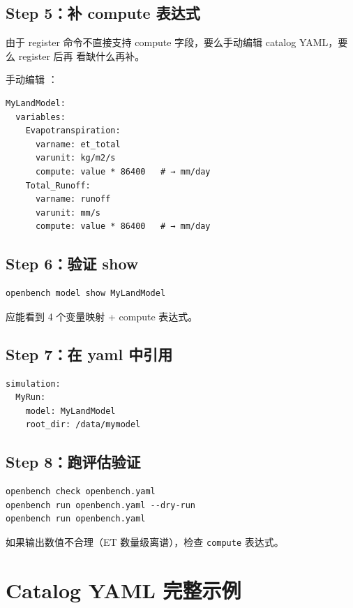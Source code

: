 \subsection{Step 5：补 compute 表达式}

由于 register 命令不直接支持 compute 字段，要么手动编辑 catalog YAML，要么 register 后再  看缺什么再补。

手动编辑 ：

\begin{verbatim}
MyLandModel:
  variables:
    Evapotranspiration:
      varname: et_total
      varunit: kg/m2/s
      compute: value * 86400   # → mm/day
    Total_Runoff:
      varname: runoff
      varunit: mm/s
      compute: value * 86400   # → mm/day
\end{verbatim}

\subsection{Step 6：验证 show}

\begin{verbatim}
openbench model show MyLandModel
\end{verbatim}

应能看到 4 个变量映射 + compute 表达式。

\subsection{Step 7：在 yaml 中引用}

\begin{verbatim}
simulation:
  MyRun:
    model: MyLandModel
    root_dir: /data/mymodel
\end{verbatim}

\subsection{Step 8：跑评估验证}

\begin{verbatim}
openbench check openbench.yaml
openbench run openbench.yaml --dry-run
openbench run openbench.yaml
\end{verbatim}

如果输出数值不合理（ET 数量级离谱），检查 \texttt{compute} 表达式。

\section{Catalog YAML 完整示例}

